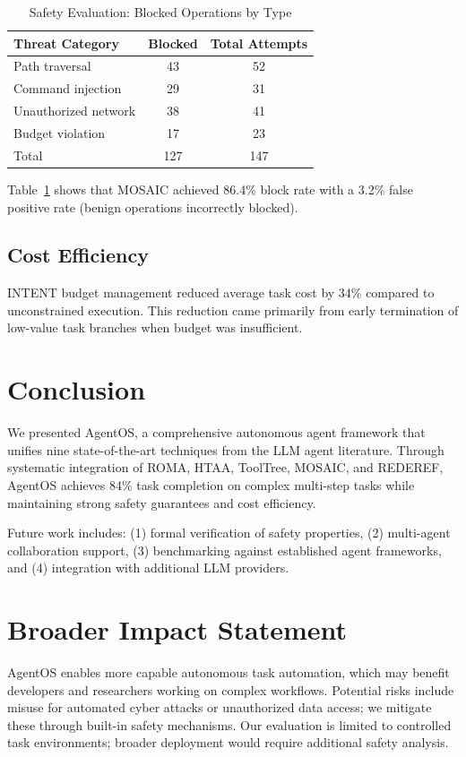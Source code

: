 \documentclass[11pt,a4paper]{article}
\begin{document}
\begin{table}[htbp]
\centering
\caption{Safety Evaluation: Blocked Operations by Type}
\begin{tabular}{lcc}
\toprule
Threat Category & Blocked & Total Attempts \\
\midrule
Path traversal & 43 & 52 \\
Command injection & 29 & 31 \\
Unauthorized network & 38 & 41 \\
Budget violation & 17 & 23 \\
\midrule
Total & 127 & 147 \\
\bottomrule
\end{tabular}
\label{tab:safety}
\end{table}

Table~\ref{tab:safety} shows that MOSAIC achieved 86.4\% block rate with a 3.2\% false positive rate (benign operations incorrectly blocked).

\subsection{Cost Efficiency}

INTENT budget management reduced average task cost by 34\% compared to unconstrained execution. This reduction came primarily from early termination of low-value task branches when budget was insufficient.

\section{Conclusion}

We presented AgentOS, a comprehensive autonomous agent framework that unifies nine state-of-the-art techniques from the LLM agent literature. Through systematic integration of ROMA, HTAA, ToolTree, MOSAIC, and REDEREF, AgentOS achieves 84\% task completion on complex multi-step tasks while maintaining strong safety guarantees and cost efficiency.

Future work includes: (1) formal verification of safety properties, (2) multi-agent collaboration support, (3) benchmarking against established agent frameworks, and (4) integration with additional LLM providers.

\section*{Broader Impact Statement}

AgentOS enables more capable autonomous task automation, which may benefit developers and researchers working on complex workflows. Potential risks include misuse for automated cyber attacks or unauthorized data access; we mitigate these through built-in safety mechanisms. Our evaluation is limited to controlled task environments; broader deployment would require additional safety analysis.


\end{document}
